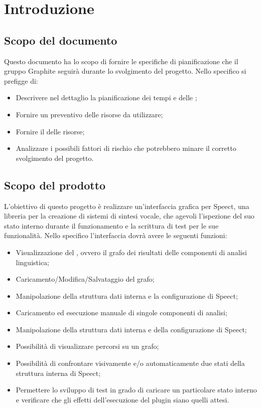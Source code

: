 \documentclass[../PianodiProgetto.tex]{subfiles}
\begin{document}
	
	\chapter{Introduzione}
	\section{Scopo del documento}
	Questo documento ha lo scopo di fornire le specifiche di pianificazione che il gruppo Graphite seguirà durante lo svolgimento del progetto. Nello specifico si prefigge di:
	
	\begin{itemize}
		\item Descrivere nel dettaglio la pianificazione dei tempi e delle ;
		\item Fornire un preventivo delle risorse da utilizzare;
		\item Fornire il  delle risorse;
		\item Analizzare i possibili fattori di rischio che potrebbero minare il corretto svolgimento del progetto.
	\end{itemize}
	
	\section{Scopo del prodotto}
	
	L'obiettivo di questo progetto è realizzare un'interfaccia grafica per Speect, una libreria per la creazione di sistemi di sintesi vocale, che agevoli l'ispezione del suo stato interno durante il funzionamento e la scrittura di test per le sue funzionalità.
	Nello specifico l'interfaccia dovrà avere le seguenti funzioni:
	\begin{itemize}
		\item Visualizzazione del , ovvero il grafo dei risultati delle componenti di analisi linguistica;
		\item Caricamento/Modifica/Salvataggio del grafo;
		\item Manipolazione della struttura dati interna e la configurazione di Speect;
		\item Caricamento ed esecuzione manuale di singole componenti di analisi;
		\item Manipolazione della struttura dati interna e della configurazione di Speect;
		\item Possibilità di visualizzare percorsi su un grafo;
		\item Possibilità di confrontare visivamente e/o automaticamente due stati della struttura interna di Speect;
		\item Permettere lo sviluppo di test in grado di caricare un particolare stato interno e verificare che gli effetti dell’esecuzione del plugin siano quelli attesi.
	\end{itemize}
	
\end{document}
